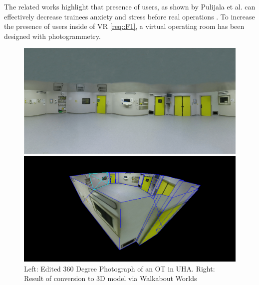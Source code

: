 The related works highlight that presence of users, as shown by Pulijala et al. can effectively decrease trainees anxiety and stress before real operations \cite{Pulijala.2017}.
To increase the presence of users inside of VR \ref{req::F1}, a virtual operating room has been designed with photogrammetry.

\begin{figure}[ht]
    \centering
    \begin{minipage}{.5\textwidth}
      \centering
      \includegraphics[width=0.99\linewidth]{images/implementation/vot/operating_room_360.png}
    \end{minipage}%
    \begin{minipage}{.5\textwidth}
      \centering
      \includegraphics[width=0.99\linewidth]{images/implementation/vot/walkabout_worlds.png}
    \end{minipage}
    \caption{\label{fig::360OperatingRoom}Left: Edited 360 Degree Photograph of an OT in UHA. Right: Result of conversion to 3D model via Walkabout Worlds}
\end{figure}


